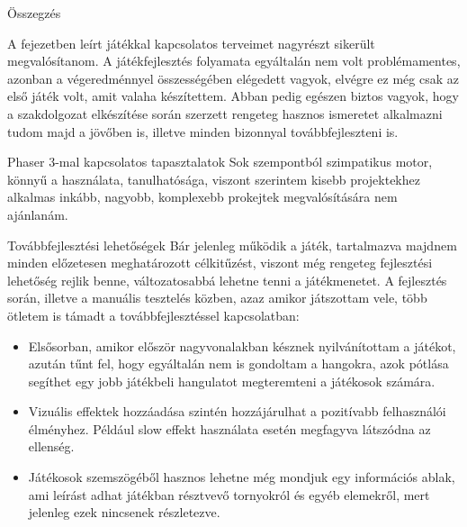 \begin{MyChapter}{Összegzés}
	
	
	A  fejezetben leírt játékkal kapcsolatos terveimet nagyrészt sikerült megvalósítanom. A játékfejlesztés folyamata egyáltalán nem volt problémamentes, azonban a végeredménnyel összességében elégedett vagyok, elvégre ez még csak az első játék volt, amit valaha készítettem.
	Abban pedig egészen biztos vagyok, hogy a szakdolgozat elkészítése során szerzett rengeteg hasznos ismeretet alkalmazni tudom majd a jövőben is, illetve minden bizonnyal továbbfejleszteni is.
	
	\begin{MySection}{Phaser 3-mal kapcsolatos tapasztalatok}
		Sok szempontból szimpatikus motor, könnyű a használata, tanulhatósága, viszont szerintem kisebb projektekhez alkalmas inkább, nagyobb, komplexebb prokejtek megvalósítására nem ajánlanám.
	\end{MySection}
	
	\begin{MySection}{Továbbfejlesztési lehetőségek}
		Bár jelenleg működik a játék, tartalmazva majdnem minden előzetesen meghatározott célkitűzést, viszont még rengeteg fejlesztési lehetőség rejlik benne, változatosabbá lehetne tenni a játékmenetet.
		A fejlesztés során, illetve a manuális tesztelés közben, azaz amikor játszottam vele, több ötletem is támadt a továbbfejlesztéssel kapcsolatban:
		
		\begin{itemize}
			\item Elsősorban, amikor először nagyvonalakban késznek nyilvánítottam a játékot, azután tűnt fel, hogy egyáltalán nem is gondoltam a hangokra, azok pótlása segíthet egy jobb játékbeli hangulatot megteremteni a játékosok számára.
			
			\item Vizuális effektek hozzáadása szintén hozzájárulhat a pozitívabb felhasználói élményhez. Például slow effekt használata esetén megfagyva látszódna az ellenség.
			
			\item Játékosok szemszögéből hasznos lehetne még mondjuk egy információs ablak, ami leírást adhat játékban résztvevő tornyokról és egyéb elemekről, mert jelenleg ezek nincsenek részletezve.
			

\end{itemize}
\end{MySection}
\end{MyChapter}
